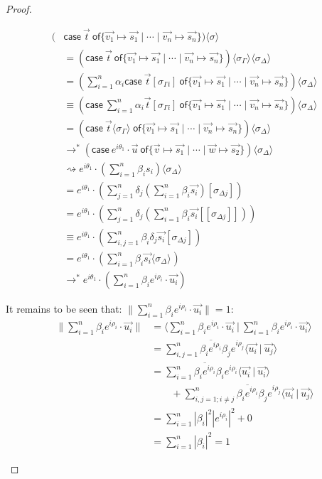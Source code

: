 \documentclass[runningheads,orivec,envcountsame,envcountsect]{llncs}
\newcommand\lra{\longrightarrow}
\newcommand\ansubst[2]{\ensuremath{\langle #1 \rangle_{#2}}}
\def\scal#1#2{\langle{#1}~|~{#2}\rangle}
\def\gencase#1#2#3#4#5{\ensuremath{\mathsf{case}~#1~\mathsf{of} \{#2\mapsto #4 \mid \dotsb \mid #3\mapsto #5\}}}
\def\lraneq{\rightsquigarrow}
\def\eval{\lra^*}
\begin{document}
\begin{proof}
\begin{description}
    \begin{align*}
        (&\gencase{\vec{t}}{\vec{v_1}}{\vec{v_n}}{\vec{s_1}}{\vec{s_n}})\ansubst{\sigma}{}\\ 
        &= (\gencase{\vec{t}}{\vec{v_1}}{\vec{v_n}}{\vec{s_1}}{\vec{s_n}})\ansubst{\sigma_\Gamma}{}\ansubst{\sigma_\Delta}{}\\
        &=(\sum_{i=1}^{n}\alpha_i \gencase{\vec{t}[\sigma_{\Gamma i}]}{\vec{v_1}}{\vec{v_n}}{\vec{s_1}}{\vec{s_n}})\ansubst{\sigma_\Delta}{} \\
        &\equiv (\gencase{\sum_{i=1}^{n} \alpha_i \vec{t}[\sigma_{\Gamma i}]}{\vec {v_1}}{\vec{v_n}}{\vec{s_1}}{\vec{s_n}})\ansubst{\sigma_\Delta}{}\\
        &=(\gencase{\vec{t}\ansubst{\sigma_\Gamma}{}}{\vec{v_1}}{\vec{v_n}}{\vec{s_1}}{\vec{s_n}})\ansubst{\sigma_\Delta}{}\\
        &\eval(\gencase{e^{i\theta_1}\cdot\vec{u}}{\vec{v}}{\vec{w}}{\vec{s_1}}{\vec{s_2}})\ansubst{\sigma_\Delta}{}\\
        &\lraneq e^{i\theta_1}\cdot(\sum_{i=1}^{n}\beta_i s_i)\ansubst{\sigma_\Delta}{}\\
        &= e^{i\theta_1}\cdot(\sum_{j=1}^{n}\delta_j (\sum_{i=1}^{n}\beta_i \vec{s_i})[\sigma_{\Delta j}])\\
        &= e^{i\theta_1}\cdot(\sum_{j=1}^{n}\delta_j (\sum_{i=1}^{n}\beta_i \vec{s_i}[[\sigma_{\Delta j}]]))\\
        &\equiv e^{i\theta_1}\cdot(\sum_{i,j=1}^{n}\beta_i\delta_j\vec{s_i}[\sigma_{\Delta j}])\\
        &= e^{i\theta_1}\cdot(\sum_{i=1}^{n}\beta_i \vec{s_i}\ansubst{\sigma_\Delta}{})\\
        &\eval e^{i\theta_1}\cdot(\sum_{i=1}^{n}\beta_i e^{i\rho_i}\cdot\vec{u_i})
    \end{align*}
    
    It remains to be seen that: $\|\sum_{i=1}^{n}\beta_i e^{i\rho_i}\cdot\vec{u_i}\|=1$:
    \begin{align*}
        \|\sum_{i=1}^{n}\beta_i e^{i\rho_i}\cdot\vec{u_i}\| &= \scal{\sum_{i=1}^{n}\beta_i e^{i\rho_i}\cdot\vec{u_i}}{\sum_{i=1}^{n}\beta_i e^{i\rho_i}\cdot\vec{u_i}}\\
        &= \sum_{i,j=1}^{n}\overline{\beta_i e^{i\rho_i}}\beta_j e^{i\rho_j} \scal{\vec{u_i}}{\vec{u_j}}\\
        &= \sum_{i=1}^{n}\overline{\beta_i e^{i\rho_i}}\beta_i e^{i\rho_i} \scal{\vec{u_i}}{\vec{u_i}}\\
        &\qquad + \sum_{i,j=1; i\neq j}^{n}\overline{\beta_i e^{i\rho_i}}\beta_j e^{i\rho_j} \scal{\vec{u_i}}{\vec{u_j}}\\
        &= \sum_{i=1}^{n}|\beta_i|^2 |e^{i\rho_i}|^2  + 0\\
        &= \sum_{i=1}^{n}|\beta_i|^2 = 1
    \end{align*}


\end{description}
\end{proof}
\end{document}
